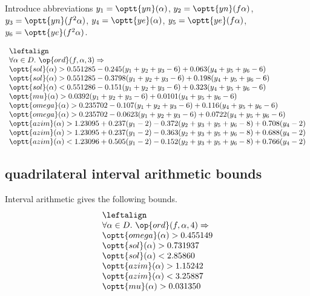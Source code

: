 Introduce abbreviations $y_1 = \optt{yn}(\alpha)$, $y_2 = \optt{yn}(f \alpha)$,
$y_3 = \optt{yn}(f^2 \alpha)$, $y_4 = \optt{ye}(\alpha)$, $y_5 = \optt{ye}(f\alpha)$, $y_6 = \optt{ye}(f^2\alpha)$.

$$
\begin{array}{lll}
\leftalign\\
\forall\alpha\in D. \ \op{ord}(f,\alpha,3) \Rightarrow \\
  \optt{sol}(\alpha) > 0.551285 - 0.245 (y_1+y_2+y_3-6) + 0.063 (y_4+y_5+y_6-6)\\
  \optt{sol}(\alpha) > 0.551285 - 0.3798 (y_1+y_2+y_3-6) + 0.198 (y_4+y_5+y_6-6)\\
  \optt{sol}(\alpha) < 0.551286 - 0.151 (y_1+y_2+y_3-6) + 0.323 (y_4+y_5+y_6-6)\\

  \optt{mu}(\alpha) > 0.0392 (y_1+y_2+y_3-6) + 0.0101 (y_4+y_5+y_6-6) \\
  \optt{omega}(\alpha) > 0.235702 -0.107 (y_1+y_2+y_3-6) + 0.116 (y_4+y_5+y_6-6)\\
  \optt{omega}(\alpha) > 0.235702 -0.0623 (y_1+y_2+y_3-6) + 0.0722 (y_4+y_5+y_6-6)\\
  \optt{azim}(\alpha) > 1.23095 + 0.237 (y_1-2) - 0.372 (y_2+y_3+y_5+y_6-8) + 0.708 (y_4-2) \\
  \optt{azim}(\alpha) > 1.23095 + 0.237 (y_1-2) - 0.363 (y_2+y_3+y_5+y_6-8) + 0.688 (y_4-2)\\
  \optt{azim}(\alpha) < 1.23096 + 0.505 (y_1-2) - 0.152(y_2+y_3+y_5+y_6-8) + 0.766 (y_4-2)\\

\end{array}
$$

\subsection{quadrilateral interval arithmetic bounds}\label{sec:quad}

Interval arithmetic gives the following bounds.
$$
\begin{array}{lll}
\leftalign\\
\forall\alpha\in D. \ \op{ord}(f,\alpha,4) \Rightarrow \\
   \optt{omega}(\alpha) > 0.455149\\
   \optt{sol}(\alpha) > 0.731937\\
   \optt{sol}(\alpha) < 2.85860\\
   \optt{azim}(\alpha) > 1.15242\\
   \optt{azim}(\alpha) < 3.25887\\
   \optt{mu}(\alpha) > 0.031350\\
\end{array}
$$


